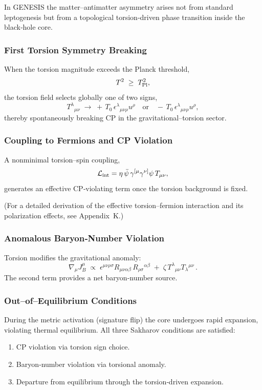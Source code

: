 \documentclass{article}
\begin{document}
In GENESIS the matter–antimatter asymmetry arises not from standard
leptogenesis but from a topological torsion‐driven phase transition inside the
black‐hole core.

\subsubsection{ First Torsion Symmetry Breaking}
When the torsion magnitude exceeds the Planck threshold,
\[
  T^2 \;\ge\; T_{\rm Pl}^2,
\]
the torsion field selects globally one of two signs,
\[
  T^{\lambda}{}_{\mu\nu}
  \;\to\;
    +\,T_0\,\epsilon^{\lambda}{}_{\mu\nu\rho}u^\rho
  \quad\text{or}\quad
    -\,T_0\,\epsilon^{\lambda}{}_{\mu\nu\rho}u^\rho,
\]
thereby spontaneously breaking CP in the gravitational–torsion sector.

\subsubsection{ Coupling to Fermions and CP Violation}
A nonminimal torsion–spin coupling,
\[
  \mathcal{L}_{\rm int}
  = \eta\,\bar\psi\,\gamma^{[\mu}\gamma^{\nu]}\psi\,T_{\mu\nu},
\]
generates an effective CP‐violating term once the torsion background is fixed.

(For a detailed derivation of the effective torsion–fermion interaction and its polarization effects, see Appendix~K.)


\subsubsection{ Anomalous Baryon‐Number Violation}
Torsion modifies the gravitational anomaly:
\[
  \nabla_\mu J_B^\mu
  \;\propto\;
    \epsilon^{\mu\nu\rho\sigma}
      R_{\mu\nu\alpha\beta}\,R_{\rho\sigma}{}^{\alpha\beta}
    \;+\;\zeta\,T^{\lambda}{}_{\mu\nu}T_{\lambda}{}^{\mu\nu}\,.
\]
The second term provides a net baryon‐number source.

\subsubsection{ Out–of–Equilibrium Conditions}
During the metric activation (signature flip) the core undergoes rapid expansion,
violating thermal equilibrium.  All three Sakharov conditions are satisfied:
\begin{enumerate}
  \item CP violation via torsion sign choice.
  \item Baryon‐number violation via torsional anomaly.
  \item Departure from equilibrium through the torsion‐driven expansion.
\end{enumerate}
\end{document}
